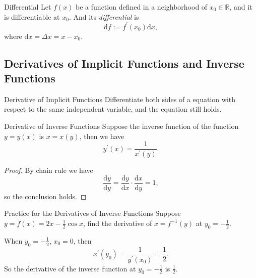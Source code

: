 \begin{definition}{Differential}{}
  Let $f(x)$ be a function defined in a neighborhood of $x_0 \in \mathbb{R}$,
  and it is differentiable at $x_0$.
  And its \emph{differential} is
  \begin{equation}
    \mathrm{d} f := f^{\prime}(x_0) \mathrm{d} x,
  \end{equation}
  where $\mathrm{d} x = \Delta x = x - x_0$.
\end{definition}

\subsection{Derivatives of Implicit Functions and Inverse Functions}

\begin{proposition}{Derivative of Implicit Functions}{}
  Differentiate both sides of a equation with respect to the same independent variable,
  and the equation still holds.
\end{proposition}

\begin{proposition}{Derivative of Inverse Functions}{}
  Suppose the inverse function of the function $y = y(x)$ is $x = x(y)$,
  then we have
  \begin{equation}
    y^{\prime}(x) = \frac{1}{x^{\prime}(y)}.
  \end{equation}
\end{proposition}

\begin{proof}
  By chain rule we have
  \begin{equation}
    \frac{\mathrm{d} y}{\mathrm{d} y} = \frac{\mathrm{d} y}{\mathrm{d} x} \cdot \frac{\mathrm{d} x}{\mathrm{d} y} = 1,
  \end{equation}
  so the conclusion holds.
\end{proof}

\begin{example}{Practice for the Derivatives of Inverse Functions}{}
  Suppose $y = f(x) = 2x - \frac{1}{2} \cos x$,
  find the derivative of $x = f^{-1}(y)$ at $y_0 = -\frac{1}{2}$.
\end{example}

\begin{solution}
  When $y_0 = - \frac{1}{2}$, $x_0 = 0$, then
  \begin{equation}
    x^{\prime}(y_0) = \frac{1}{y^{\prime}(x_0)} = \frac{1}{2}.
  \end{equation}
  So the derivative of the inverse function at $y_0 = - \frac{1}{2}$ is $\frac{1}{2}$.
\end{solution}

